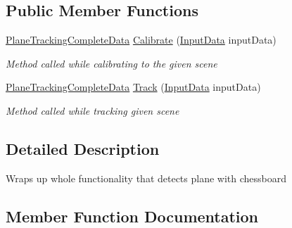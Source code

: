 \subsection*{Public Member Functions}
\begin{DoxyCompactItemize}
\item 
\mbox{\hyperlink{class_chess_tracking_1_1_image_processing_1_1_pipeline_data_1_1_plane_tracking_complete_data}{Plane\+Tracking\+Complete\+Data}} \mbox{\hyperlink{interface_chess_tracking_1_1_image_processing_1_1_pipeline_parts_1_1_stages_interfaces_1_1_i_plane_localization_a51e84fb5106e34dbe4f2775b82fb2a7e}{Calibrate}} (\mbox{\hyperlink{class_chess_tracking_1_1_image_processing_1_1_pipeline_data_1_1_input_data}{Input\+Data}} input\+Data)
\begin{DoxyCompactList}\small\item\em Method called while calibrating to the given scene \end{DoxyCompactList}\item 
\mbox{\hyperlink{class_chess_tracking_1_1_image_processing_1_1_pipeline_data_1_1_plane_tracking_complete_data}{Plane\+Tracking\+Complete\+Data}} \mbox{\hyperlink{interface_chess_tracking_1_1_image_processing_1_1_pipeline_parts_1_1_stages_interfaces_1_1_i_plane_localization_a03e2c5fc754830f91491a704352c24cf}{Track}} (\mbox{\hyperlink{class_chess_tracking_1_1_image_processing_1_1_pipeline_data_1_1_input_data}{Input\+Data}} input\+Data)
\begin{DoxyCompactList}\small\item\em Method called while tracking given scene \end{DoxyCompactList}\end{DoxyCompactItemize}


\subsection{Detailed Description}
Wraps up whole functionality that detects plane with chessboard 



\subsection{Member Function Documentation}
\mbox{\label{interface_chess_tracking_1_1_image_processing_1_1_pipeline_parts_1_1_stages_interfaces_1_1_i_plane_localization_a51e84fb5106e34dbe4f2775b82fb2a7e}} 
